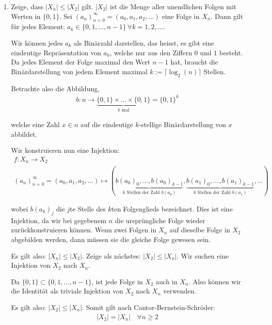 \documentclass[12pt]{article}
\begin{document}
\begin{enumerate}[label=\alph*)]
    \item Zeige, dass $|X_n| \leq |X_2|$ gilt. $|X_2|$ ist die Menge aller unendlichen Folgen mit Werten in $\{0, 1\}$. Sei $(a_n)_{n=0}^{\infty} = (a_0,a_1,a_2,\dots)$ eine Folge in $X_n$. Dann gilt für jedes Element: $a_k \in \{0, 1,\dots,n-1\} \ \forall k = 1,2,\dots$. 
    
    Wir können jedes $a_k$ als Binärzahl darstellen, das heisst, es gibt eine eindeutige Repräsentation von $a_k$, welche nur aus den Ziffern $0$ und $1$ besteht. Da jedes Element der Folge maximal den Wert $n-1$ hat, braucht die Binärdarstellung von jedem Element maximal $k := \lceil \log_2(n) \rceil$ Stellen.

    Betrachte also die Abbildung,
    \[
    \begin{aligned}
        b: n \rightarrow \underbrace{\{0, 1\} \times \dots \times \{0, 1\}}_{k \text{ mal}} = \{0, 1\}^k
    \end{aligned}
    \]

    welche eine Zahl $x \in n$ auf die eindeutige $k$-stellige Binärdarstellung von $x$ abbildet.
    

    Wir konstruieren nun eine Injektion:
    \begin{gather*}
        f: X_n \rightarrow X_2 \\
        (a_n)_{n=0}^{\infty} = (a_0,a_1,a_2,\dots) \mapsto (\underbrace{b(a_0)_0, \dots, b(a_0)_{k-1}}_{k \text{ Stellen der Zahl } b(a_0)}, \underbrace{b(a_1)_0, \dots, b(a_1)_{k-1}}_{k \text{ Stellen der Zahl } b(a_1)}, \dots)        
    \end{gather*}

    wobei $b(a_k)_j$ die $j$te Stelle des $k$ten Folgenglieds bezeichnet. Dies ist eine Injektion, da wir bei gegebenem $n$ die ursprüngliche Folge wieder zurückkonstruieren können. Wenn zwei Folgen in $X_n$ auf dieselbe Folge in $X_2$ abgebilden werden, dann müssen sie die gleiche Folge gewesen sein.

    Es gilt also: $|X_n| \leq |X_2|$. Zeige als nächstes: $|X_2| \leq |X_n|$. Wir suchen eine Injektion von $X_2$ nach $X_n$.

    Da $\{0, 1\} \subset \{0, 1, \dots, n-1\}$, ist jede Folge in $X_2$ auch in $X_n$. Also können wir die Identität als triviale Injektion von $X_2$ nach $X_n$ verwenden.

    Es gilt also: $|X_2| \leq |X_n|$. Somit gilt nach Cantor-Bernstein-Schröder:
    \begin{align*}
        |X_2| = |X_n| \quad \forall n \geq 2
    \end{align*}


\end{enumerate}
\end{document}
